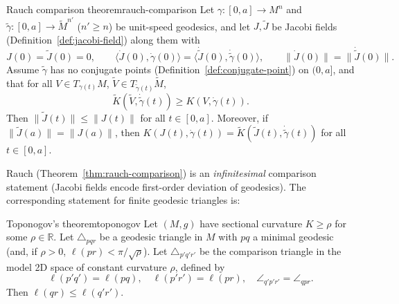 \begin{colortheo}{Rauch comparison theorem}{rauch-comparison}
Let $\gamma \colon [0, a] \to M^n$ and $\tilde\gamma \colon [0, a] \to \widetilde M^{n'}$ ($n' \geqslant n$) be unit-speed geodesics, and let $J, \tilde J$ be Jacobi fields (Definition~\ref{def:jacobi-field}) along them with
\[
J(0) = \tilde J(0) = 0, \qquad \langle \dot J(0), \dot\gamma(0)\rangle = \langle \dot{\tilde J}(0), \dot{\tilde\gamma}(0)\rangle, \qquad \|\dot J(0)\| = \|\dot{\tilde J}(0)\|.
\]
Assume $\tilde\gamma$ has no conjugate points (Definition~\ref{def:conjugate-point}) on $(0, a]$, and that for all $V \in T_{\gamma(t)} M$, $\widetilde V \in T_{\tilde\gamma(t)} \widetilde M$,
\[
\widetilde K(\widetilde V, \dot{\tilde\gamma}(t)) \geqslant K(V, \dot\gamma(t)).
\]
Then $\|\tilde J(t)\| \leqslant \|J(t)\|$ for all $t \in [0, a]$. Moreover, if $\|\tilde J(a)\| = \|J(a)\|$, then $K(J(t), \dot\gamma(t)) = \widetilde K(\tilde J(t), \dot{\tilde\gamma}(t))$ for all $t \in [0, a]$.
\end{colortheo}

Rauch (Theorem~\ref{thm:rauch-comparison}) is an \emph{infinitesimal} comparison statement (Jacobi fields encode first-order deviation of geodesics). The corresponding statement for finite geodesic triangles is:

\begin{colortheo}{Toponogov's theorem}{toponogov}
Let $(M, g)$ have sectional curvature $K \geqslant \rho$ for some $\rho \in \mathbb{R}$. Let $\triangle_{pqr}$ be a geodesic triangle in $M$ with $pq$ a minimal geodesic (and, if $\rho > 0$, $\ell(pr) < \pi/\sqrt\rho$). Let $\triangle_{p'q'r'}$ be the comparison triangle in the model 2D space of constant curvature $\rho$, defined by
\[
\ell(p'q') = \ell(pq), \quad \ell(p'r') = \ell(pr), \quad \angle_{q'p'r'} = \angle_{qpr}.
\]
Then $\ell(qr) \leqslant \ell(q'r')$.
\end{colortheo}







